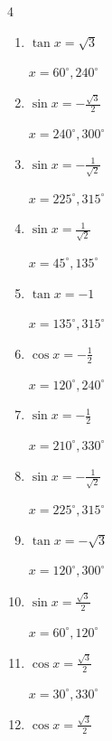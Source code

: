 \begin{multicols}{4}
\begin{enumerate}
        $\displaystyle x = 60^{\circ} , 300^{\circ}$

  \item $\displaystyle \tan{x}  = \sqrt{3}$

        $\displaystyle x = 60^{\circ} , 240^{\circ}$

  \item $\displaystyle \sin{x}  = -\frac{\sqrt{3}}{2}$

        $\displaystyle x = 240^{\circ} , 300^{\circ}$

  \item $\displaystyle \sin{x}  = -\frac{1}{\sqrt{2}}$

        $\displaystyle x = 225^{\circ} , 315^{\circ}$

  \item $\displaystyle \sin{x}  = \frac{1}{\sqrt{2}}$

        $\displaystyle x = 45^{\circ} , 135^{\circ}$

  \item $\displaystyle \tan{x}  = -1$

        $\displaystyle x = 135^{\circ} , 315^{\circ}$

  \item $\displaystyle \cos{x}  = -\frac{1}{2}$

        $\displaystyle x = 120^{\circ} , 240^{\circ}$

  \item $\displaystyle \sin{x}  = -\frac{1}{2}$

        $\displaystyle x = 210^{\circ} , 330^{\circ}$

  \item $\displaystyle \sin{x}  = -\frac{1}{\sqrt{2}}$

        $\displaystyle x = 225^{\circ} , 315^{\circ}$

  \item $\displaystyle \tan{x}  = -\sqrt{3}$

        $\displaystyle x = 120^{\circ} , 300^{\circ}$

  \item $\displaystyle \sin{x}  = \frac{\sqrt{3}}{2}$

        $\displaystyle x = 60^{\circ} , 120^{\circ}$

  \item $\displaystyle \cos{x}  = \frac{\sqrt{3}}{2}$

        $\displaystyle x = 30^{\circ} , 330^{\circ}$

  \item $\displaystyle \cos{x}  = \frac{\sqrt{3}}{2}$


\end{enumerate}
\end{multicols}
